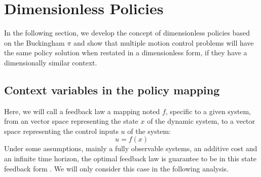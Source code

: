 














\section{Dimensionless Policies}
\label{sec:dimenanalysis}

In the following section, we develop the concept of dimensionless policies based on the Buckingham $\pi$ and show that multiple motion control problems will have the same policy solution when restated in a dimensionless form, if they have a dimensionally similar context.

\subsection{Context variables in the policy mapping}

Here, we will call a feedback law a mapping noted $f$, specific to a given system, from an vector space representing the state $x$ of the dynamic system, to a vector space representing the control inputs $u$ of the system:
\begin{equation}
u
=
f \left(
x
\right)
\end{equation}
Under some assumptions, mainly a fully observable systems, an additive cost and an infinite time horizon, the optimal feedback law is guarantee to be in this state feedback form \cite{bertsekas_dynamic_2012}. We will only consider this case in the following analysis.

